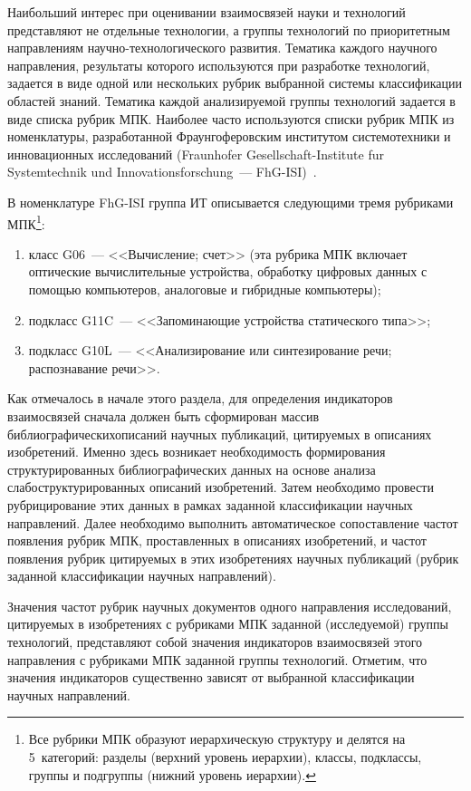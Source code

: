 \begin{multicols}{2}
  Наибольший интерес при оценивании взаимосвязей науки и технологий представляют не 
отдельные технологии, а группы технологий по приоритетным направлениям 
на\-уч\-но-тех\-но\-ло\-ги\-че\-ско\-го развития. Тематика каждого научного направления, результаты которого 
используются при разработке технологий, задается в виде одной или нескольких рубрик 
выбранной системы классификации областей знаний. Тематика каждой анализируемой группы 
технологий задается в виде списка рубрик МПК. Наиболее часто используются списки рубрик 
МПК из номенклатуры, разработанной Фраунгоферовским институтом системотехники и 
инновационных исследований (Fraunhofer Gesellschaft-Institute fur Systemtechnik und 
Innovationsforschung~--- FhG-ISI)~\cite{19-zac}.
  
  В номенклатуре FhG-ISI группа ИТ описывается 
следующими тремя рубриками МПК\footnote{Все рубрики МПК образуют иерархическую структуру и 
делятся на 5~категорий: разделы (верхний уровень иерархии), классы, подклассы, группы и подгруппы (нижний 
уровень иерархии).}:
  \begin{enumerate}[(1)]
\item класс G06~--- <<Вычисление; счет>> (эта рубрика МПК включает оптические 
вычислительные устройства, обработку цифровых данных с помощью компьютеров, 
аналоговые и гибридные компьютеры);
\columnbreak

\item подкласс G11C~--- <<Запоминающие устройства статического типа>>;
\item подкласс G10L~--- <<Анализирование или синтезирование речи; распознавание 
речи>>.
  \end{enumerate}
  
  Как отмечалось в начале этого раздела, для определения индикаторов взаимосвязей сначала 
должен быть сформирован массив библиографических\linebreak описаний научных публикаций, 
цитируемых в описаниях изобретений. Именно здесь возникает не\-обходимость формирования 
структурированных биб\-лио\-графических данных на основе анализа слабоструктурированных 
описаний изобретений. Затем необходимо провести рубрицирование этих данных в рамках 
заданной классификации научных на\-прав\-ле\-ний. Далее необходимо выполнить автоматическое 
сопоставление частот появления рубрик МПК, проставленных в описаниях изобретений, и 
частот появления рубрик цитируемых в этих изобретениях научных публикаций (рубрик 
заданной классификации научных направлений).
  
  Значения частот рубрик научных документов одного направления исследований, 
цитируемых в изобретениях с рубриками МПК заданной (исследуемой) группы технологий, 
представляют собой значения индикаторов взаимосвязей этого на\-прав\-ле\-ния с рубриками МПК 
заданной группы технологий. Отметим, что значения индикаторов существенно зависят от 
выбранной классификации научных направлений.
  

\end{multicols}
